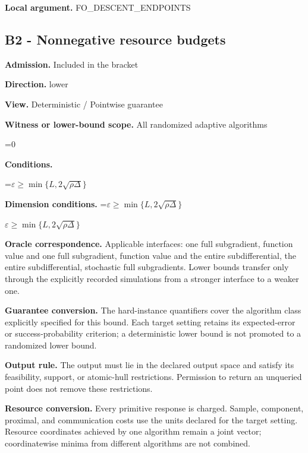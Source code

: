 \documentclass[10pt,a4paper]{article}
\newcommand{\AtlasMath}[1]{\par\begingroup\centering\setbox0=\hbox{$\displaystyle #1$}\ifdim\wd0>1.4\linewidth\typeout{ATLAS WIDE FORMULA: \the\wd0}\fi\ifdim\wd0>\linewidth\resizebox{\linewidth}{!}{\box0}\else\box0\fi\par\endgroup}
\newcommand{\AtlasInlineMath}[1]{\begingroup\setbox0=\hbox{$#1$}\ifdim\wd0>.4\linewidth\endgroup\AtlasMath{#1}\else\endgroup$#1$\fi}
\begin{document}
\textbf{Local argument.} FO\_DESCENT\_ENDPOINTS



\subsection{B2 - Nonnegative resource budgets}


\textbf{Admission.} Included in the bracket



\textbf{Direction.} lower



\textbf{View.} Deterministic / Pointwise guarantee



\textbf{Witness or lower-bound scope.} All randomized adaptive algorithms



\AtlasMath{0}


\textbf{Conditions.}
\AtlasMath{\varepsilon\ge\min\{L,2\sqrt{\rho\Delta}\}}




\textbf{Dimension conditions.} \AtlasInlineMath{\varepsilon\ge\min\{L,2\sqrt{\rho\Delta}\}}



\textbf{Oracle correspondence.} Applicable interfaces: one full subgradient, function value and one full subgradient, function value and the entire subdifferential, the entire subdifferential, stochastic full subgradients. Lower bounds transfer only through the explicitly recorded simulations from a stronger interface to a weaker one.



\textbf{Guarantee conversion.} The hard-instance quantifiers cover the algorithm class explicitly specified for this bound. Each target setting retains its expected-error or success-probability criterion; a deterministic lower bound is not promoted to a randomized lower bound.



\textbf{Output rule.} The output must lie in the declared output space and satisfy its feasibility, support, or atomic-hull restrictions. Permission to return an unqueried point does not remove these restrictions.



\textbf{Resource conversion.} Every primitive response is charged. Sample, component, proximal, and communication costs use the units declared for the target setting. Resource coordinates achieved by one algorithm remain a joint vector; coordinatewise minima from different algorithms are not combined.
\end{document}
